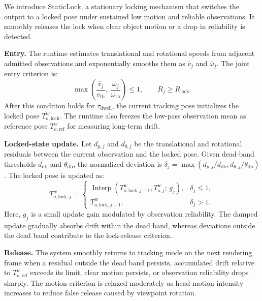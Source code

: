\documentclass[review]{vgtc}
\begin{document}
We introduce StaticLock, a stationary locking mechanism that switches the output to a locked pose under sustained low motion and reliable observations. It smoothly releases the lock when clear object motion or a drop in reliability is detected.

\textbf{Entry.}
The runtime estimates translational and rotational speeds from adjacent admitted observations and exponentially smooths them as $\bar v_j$ and $\bar\omega_j$. The joint entry criterion is:
\begin{equation}
\max\left(\frac{\bar{v}_j}{v_{\mathrm{th}}},\ \frac{\bar{\omega}_j}{\omega_{\mathrm{th}}}\right) \leq 1, \qquad R_j \geq R_{\mathrm{lock}}.
\label{eq:lock-entry}
\end{equation}
After this condition holds for $\tau_{\mathrm{dwell}}$, the current tracking pose initializes the locked pose $T_{o,\mathrm{lock}}^w$. The runtime also freezes the low-pass observation mean as reference pose $T_{o,\mathrm{ref}}^w$ for measuring long-term drift.

\textbf{Locked-state update.}
Let $d_{p,j}$ and $d_{\theta,j}$ be the translational and rotational residuals between the current observation and the locked pose. Given dead-band thresholds $d_{\mathrm{db}}$ and $\theta_{\mathrm{db}}$, the normalized deviation is $\delta_j=\max(d_{p,j}/d_{\mathrm{db}},d_{\theta,j}/\theta_{\mathrm{db}})$. The locked pose is updated as:
\begin{equation}
T_{o,\mathrm{lock},j}^w =
\begin{cases}
\operatorname{Interp}\left(T_{o,\mathrm{lock},j-1}^w, T_{o,j}^{w};\, g_j\right), & \delta_j \leq 1, \\
T_{o,\mathrm{lock},j-1}^w, & \delta_j > 1.
\end{cases}
\label{eq:lock-update}
\end{equation}
Here, $g_j$ is a small update gain modulated by observation reliability. The damped update gradually absorbs drift within the dead band, whereas deviations outside the dead band contribute to the lock-release criterion.

\textbf{Release.}
The system smoothly returns to tracking mode on the next rendering frame when a residual outside the dead band persists, accumulated drift relative to $T_{o,\mathrm{ref}}^w$ exceeds its limit, clear motion persists, or observation reliability drops sharply. The motion criterion is relaxed moderately as head-motion intensity increases to reduce false release caused by viewpoint rotation.
\end{document}
